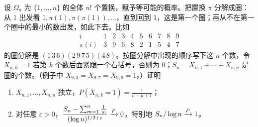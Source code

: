 \begin{workedexample}[随机置换的圈数]\label{we:weak-laws:cycles}
设 $\Omega_n$ 为 $\{1,\dots,n\}$ 的全体 $n!$ 个置换，赋予等可能的概率。把置换 $\pi$ 分解成圈：从 $1$ 出发看 $1,\pi(1),\pi(\pi(1)),\dots$，直到回到 $1$，这是第一个圈；再从不在第一个圈中的最小的数出发，如此下去。比如
\[
\begin{array}{c|ccccccccc}i&1&2&3&4&5&6&7&8&9\\\hline\pi(i)&3&9&6&8&2&1&5&4&7\end{array}
\]
的圈分解是 $(1\,3\,6)(2\,9\,7\,5)(4\,8)$。按圈分解中出现的顺序写下这 $n$ 个数，令 $X_{n,k}=1$ 若第 $k$ 个数后面紧跟一个右括号，否则为 $0$；$S_n=X_{n,1}+\cdots+X_{n,n}$ 是圈的个数。（例子中 $X_{9,3}=X_{9,7}=X_{9,9}=1$。）证明
\begin{enumerate}
\item $X_{n,1},\dots,X_{n,n}$ 独立，$P(X_{n,k}=1)=\frac1{n-k+1}$；
\item 对任意 $\varepsilon>0$，$\dfrac{S_n-\sum_{m=1}^n\frac1m}{(\log n)^{1/2+\varepsilon}}\xrightarrow{P}0$，特别地 $S_n/\log n\xrightarrow{P}1$。
\end{enumerate}
\end{workedexample}
